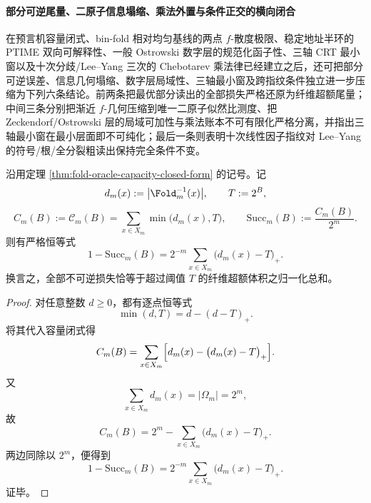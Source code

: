 \paragraph{部分可逆尾量、二原子信息塌缩、乘法外置与条件正交的横向闭合}
在预言机容量闭式、bin-fold 相对均匀基线的两点 \(f\)-散度极限、稳定地址半环的 PTIME 双向可解释性、一般 Ostrowski 数字层的规范化函子性、三轴 CRT 最小窗以及十次分歧/Lee--Yang 三次的 Chebotarev 乘法律已经建立之后，还可把部分可逆误差、信息几何塌缩、数字层局域性、三轴最小窗及跨指纹条件独立进一步压缩为下列六条结论。前两条把最优部分读出的全部损失严格还原为纤维超额尾量；中间三条分别把渐近 \(f\)-几何压缩到唯一二原子似然比测度、把 Zeckendorf/Ostrowski 层的局域可加性与乘法账本不可有限化严格分离，并指出三轴最小窗在最小层面即不可纯化；最后一条则表明十次线性因子指纹对 Lee--Yang 的符号/根/全分裂粗读出保持完全条件不变。

\begin{theorem}[最优部分可逆率的溢出恒等式]\label{thm:xi-time-part64b-optimal-partial-invertibility-overflow}
沿用定理 \ref{thm:fold-oracle-capacity-closed-form} 的记号。记
\[
d_m(x):=\bigl|\Fold_m^{-1}(x)\bigr|,
\qquad
T:=2^B,
\]
\[
C_m(B):=\mathcal C_m(B)=\sum_{x\in X_m}\min\bigl(d_m(x),T\bigr),
\qquad
\mathrm{Succ}_m(B):=\frac{C_m(B)}{2^m}.
\]
则有严格恒等式
\[
\boxed{\;
1-\mathrm{Succ}_m(B)
=
2^{-m}\sum_{x\in X_m}\bigl(d_m(x)-T\bigr)_+.\;}
\]
换言之，全部不可逆损失恰等于超过阈值 \(T\) 的纤维超额体积之归一化总和。
\end{theorem}
\begin{proof}
对任意整数 \(d\ge 0\)，都有逐点恒等式
\[
\min(d,T)=d-(d-T)_+.
\]
将其代入容量闭式得
\[
C_m(B)
=
\sum_{x\in X_m}\Bigl[d_m(x)-\bigl(d_m(x)-T\bigr)_+\Bigr].
\]
又
\[
\sum_{x\in X_m}d_m(x)=|\Omega_m|=2^m,
\]
故
\[
C_m(B)=2^m-\sum_{x\in X_m}\bigl(d_m(x)-T\bigr)_+.
\]
两边同除以 \(2^m\)，便得到
\[
1-\mathrm{Succ}_m(B)
=
2^{-m}\sum_{x\in X_m}\bigl(d_m(x)-T\bigr)_+.
\]
证毕。
\end{proof}

